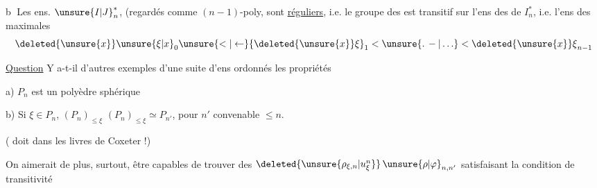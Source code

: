 \textcircled{b} Les ens.  $ {\unsure{I|J}}_n^*$, (regardés comme $(n-1)$-poly, sont \uline{réguliers}, i.e. le groupe des  est transitif sur l'ens des  de $I_n^*$, i.e. l'ens des  maximales
\[
{\deleted{\unsure{x}}\unsure{\xi|x}}_0\unsure{<|\leftarrow}{\deleted{\unsure{x}}\xi}_1<\unsure{.\,-|\ldots}<{\deleted{\unsure{x}}\xi}_{n-1}
\]

\uline{Question} Y a-t-il d'autres exemples d'une suite    d'ens ordonnés  les propriétés

a) $P_n$ est un polyèdre \uline{} sphérique

b) Si $\xi\in P_n$,   $(P_n)_{\leq\xi}$  $(P_n)_{\leq\xi}\simeq P_{n'}$, pour $n'$ convenable $\leq n$.

( doit  dans les livres de Coxeter !)

On aimerait de plus, surtout, être capables de trouver des $\deleted{\unsure{\rho_{\xi,n}|u^n_\xi}}\,{\unsure{\rho|\varphi}}_{n,n'}$ satisfaisant la condition de transitivité
